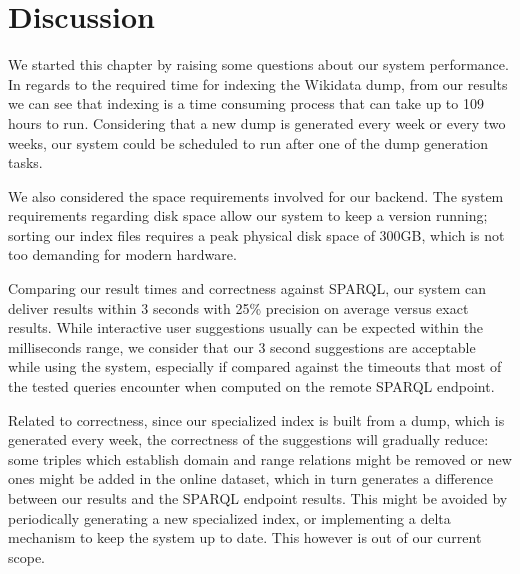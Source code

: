 
\section{Discussion}

We started this chapter by raising some questions about our system performance. In regards to the required time for indexing the Wikidata dump, from our results we can see that indexing is a time consuming process that can take up to 109 hours to run. Considering that a new dump is generated every week or every two weeks, our system could be scheduled to run after one of the dump generation tasks.

We also considered the space requirements involved for our backend. The system requirements regarding disk space allow our system to keep a version running; sorting our index files requires a peak physical disk space of 300GB, which is not too demanding for modern hardware.

Comparing our result times and correctness against SPARQL, our system can deliver results within 3 seconds with 25\% precision on average versus exact results. While interactive user suggestions usually can be expected within the milliseconds range, we consider that our 3 second suggestions are acceptable while using the system, especially if compared against the timeouts that most of the tested queries encounter when computed on the remote SPARQL endpoint.

Related to correctness, since our specialized index is built from a dump, which is generated every week, the correctness of the suggestions will gradually reduce: some triples which establish  domain and range relations might be removed or new ones might be added in the online dataset, which in turn generates a difference between our results and the SPARQL endpoint results. This might be avoided by periodically generating a new specialized index, or implementing a delta mechanism to keep the system up to date. This however is out of our current scope.
